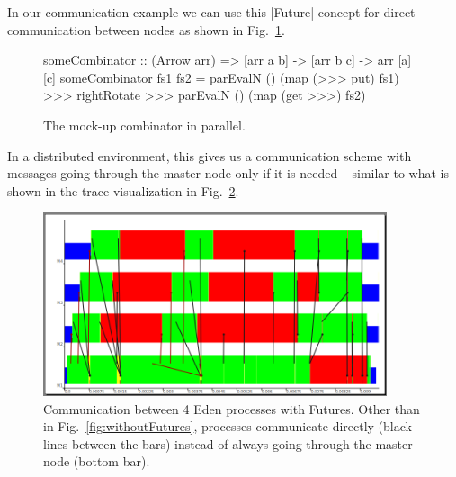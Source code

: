 In our communication example we can use this |Future| concept for direct communication between nodes as shown in Fig.~\ref{fig:someCombinatorParallel}.
\begin{figure}[tbh]
\begin{code}
someCombinator :: (Arrow arr) => [arr a b] -> [arr b c] -> arr [a] [c]
someCombinator fs1 fs2 =
	parEvalN () (map (>>> put) fs1) >>>
	rightRotate >>>
	parEvalN () (map (get >>>) fs2)
\end{code}
\caption{The mock-up combinator in parallel.}
\label{fig:someCombinatorParallel}
\end{figure}
In a distributed environment, this gives us a communication scheme with messages going through the master node only if it is needed -- similar to what is shown in the trace visualization in Fig.~\ref{fig:withFutures}. 
\begin{figure}[ht]
	\centering
	\includegraphics[width=0.9\textwidth]{images/withFutures}
	\caption[with Futures]{Communication between 4 Eden processes with Futures. Other than in Fig.~\ref{fig:withoutFutures}, processes communicate directly (black lines between the bars) instead of always going through the master node (bottom bar).}
	\label{fig:withFutures}
\end{figure}
